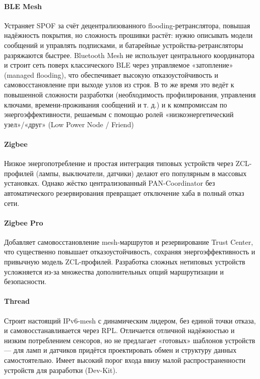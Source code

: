 \documentclass[14pt,a4paper]{extarticle}
\begin{document}
\paragraph{BLE Mesh}
Устраняет SPOF за счёт децентрализованного flooding-ретранслятора, повышая надёжность покрытия, но сложность прошивки растёт: нужно описывать модели сообщений и управлять подписками, и батарейные устройства-ретрансляторы разряжаются быстрее.
Bluetooth Mesh не использует центрального координатора и строит сеть поверх классического BLE через управляемое «затопление» (managed flooding), что обеспечивает высокую отказоустойчивость и самовосстановление при выходе узлов из строя. В то же время это ведёт к повышенной сложности разработки (необходимость профилирования, управления ключами, времени-проживания сообщений и т. д.) и к компромиссам по энергоэффективности, решаемым с помощью ролей «низкоэнергетический узел»/«друг» (Low Power Node / Friend)

\paragraph{Zigbee}
Низкое энергопотребление и простая интеграция типовых устройств через ZCL-профилей (лампы, выключатели, датчики) делают его популярным в массовых установках. Однако жёстко централизованный PAN-Coordinator без автоматического резервирования превращает отключение хаба в полный отказ сети.

\paragraph{Zigbee Pro}
Добавляет самовосстановление mesh-маршрутов и резервирование Trust Center, что существенно повышает отказоустойчивость, сохраняя энергоэффективность и привычную модель ZCL-профилей. Разработка сложных нетиповых устройств усложняется из-за множества дополнительных опций маршрутизации и безопасности.

\paragraph{Thread}
Строит настоящий IPv6-mesh с динамическим лидером, без единой точки отказа, и самовосстанавливается через RPL. Отличается отличной надёжностью и низким потреблением сенсоров, но не предлагает «готовых» шаблонов устройств — для ламп и датчиков придётся проектировать обмен и структуру данных самостоятельно. Имеет высокий порог входа ввизу малой распространенности устройств для разработки (Dev-Kit).
\end{document}

